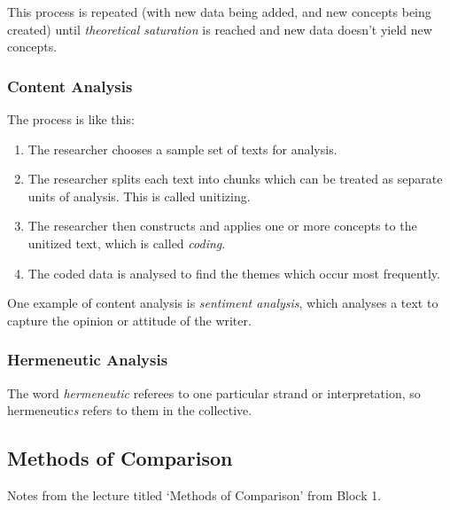 This process is repeated (with new data being added, and new concepts
being created) until \textit{theoretical saturation} is reached and
new data doesn't yield new concepts.

\subsubsection{Content Analysis}


The process is like this:
\begin{enumerate}
\item The researcher chooses a sample set of texts for analysis.
\item The researcher splits each text into chunks which can be treated
  as separate units of analysis. This is called unitizing.
\item The researcher then constructs and applies one or more concepts
  to the unitized text, which is called \textit{coding}.
\item The coded data is analysed to find the themes which occur most
  frequently.
\end{enumerate}

One example of content analysis is \textit{sentiment analysis}, which
analyses a text to capture the opinion or attitude of the writer.

\subsubsection{Hermeneutic Analysis}

 The word
\textit{hermeneutic} referees to one particular strand or
interpretation, so hermeneutic\textit{s} refers to them in the
collective.

\subsection{Methods of Comparison}
\begin{flushright}
  \scriptsize Notes from the lecture titled `Methods of Comparison'
  from Block 1.
\end{flushright}

